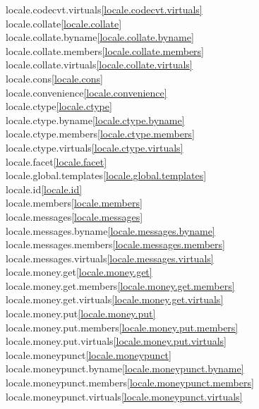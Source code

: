 \begin{multicols}{2}
locale.codecvt.virtuals\quad\ref{locale.codecvt.virtuals}\\
locale.collate\quad\ref{locale.collate}\\
locale.collate.byname\quad\ref{locale.collate.byname}\\
locale.collate.members\quad\ref{locale.collate.members}\\
locale.collate.virtuals\quad\ref{locale.collate.virtuals}\\
locale.cons\quad\ref{locale.cons}\\
locale.convenience\quad\ref{locale.convenience}\\
locale.ctype\quad\ref{locale.ctype}\\
locale.ctype.byname\quad\ref{locale.ctype.byname}\\
locale.ctype.members\quad\ref{locale.ctype.members}\\
locale.ctype.virtuals\quad\ref{locale.ctype.virtuals}\\
locale.facet\quad\ref{locale.facet}\\
locale.global.templates\quad\ref{locale.global.templates}\\
locale.id\quad\ref{locale.id}\\
locale.members\quad\ref{locale.members}\\
locale.messages\quad\ref{locale.messages}\\
locale.messages.byname\quad\ref{locale.messages.byname}\\
locale.messages.members\quad\ref{locale.messages.members}\\
locale.messages.virtuals\quad\ref{locale.messages.virtuals}\\
locale.money.get\quad\ref{locale.money.get}\\
locale.money.get.members\quad\ref{locale.money.get.members}\\
locale.money.get.virtuals\quad\ref{locale.money.get.virtuals}\\
locale.money.put\quad\ref{locale.money.put}\\
locale.money.put.members\quad\ref{locale.money.put.members}\\
locale.money.put.virtuals\quad\ref{locale.money.put.virtuals}\\
locale.moneypunct\quad\ref{locale.moneypunct}\\
locale.moneypunct.byname\quad\ref{locale.moneypunct.byname}\\
locale.moneypunct.members\quad\ref{locale.moneypunct.members}\\
locale.moneypunct.virtuals\quad\ref{locale.moneypunct.virtuals}\\

\end{multicols}
